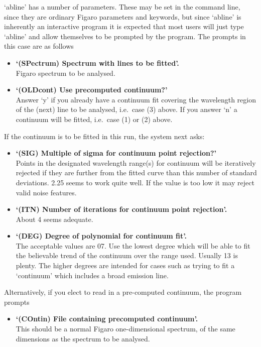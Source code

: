    `abline' has a number of parameters.  These may be set in the command
   line, since they are ordinary Figaro parameters and keywords, but
   since `abline' is inherently an interactive program it is expected
   that most users will just type `abline' and allow themselves to be
   prompted by the program.  The prompts in this case are as
   follows\latorhtm{---}{-}

\begin{itemize}
\item{\bf `(SPectrum) Spectrum with lines to be fitted'.}\ \\
   Figaro spectrum to be analysed.
\item{\bf `(OLDcont) Use precomputed continuum?'}\ \\
   Answer `y' if you already have a continuum fit covering the
   wavelength region of the (next) line to be analysed, i.e.\ case (3)
   above. If you answer `n' a continuum will be fitted, i.e.\ case (1) or
   (2) above.
\end{itemize}

   If the continuum is to be fitted in this run, the system next asks:

\begin{itemize}
\item{\bf `(SIG) Multiple of sigma for continuum point rejection?'}\ \\
   Points in the designated wavelength range(s) for continuum will be
   iteratively rejected if they are further from the fitted curve than
   this number of standard deviations. 2.25 seems to work quite well. If
   the value is too low it may reject valid noise features.
\item{\bf `(ITN) Number of iterations for continuum point rejection'.}\ \\
   About 4 seems adequate.
\item{\bf `(DEG) Degree of polynomial for continuum fit'.}\ \\
   The acceptable values are 0\latorhtm{--}{-}7. Use the lowest degree which
   will be
   able to fit the believable trend of the continuum over the range
   used. Usually 1\latorhtm{--}{-}3 is plenty. The higher degrees are
   intended for
   cases such as trying to fit a `continuum' which includes a broad
   emission line.
\end{itemize}

   Alternatively, if you elect to read in a pre-computed continuum, the
   program prompts

\begin{itemize}
\item{\bf `(COntin) File containing precomputed continuum'.}\ \\
   This should be a normal Figaro one-dimensional spectrum, of the same
   dimensions as the spectrum to be analysed.
\end{itemize}

